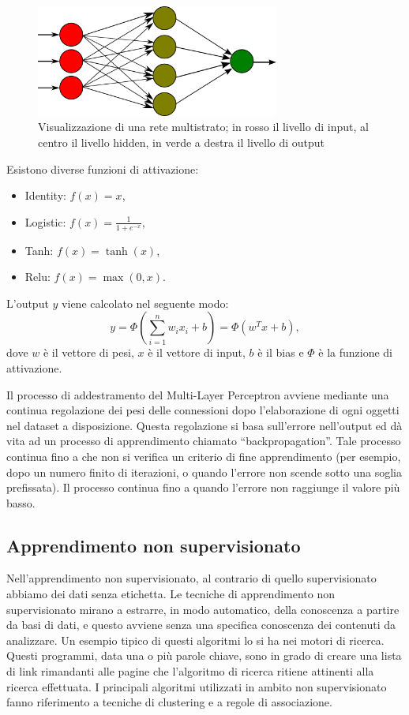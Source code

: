 \documentclass[12pt,italian]{report}
\begin{document}
\begin{figure}[h]
	\centering
	\includegraphics[width = 80mm]{immagini/Multilayer-Perceptron}
	\caption{Visualizzazione di una rete multistrato; in rosso il livello di input, al centro il livello hidden, in verde a destra il livello di output}
\end{figure}
Esistono diverse funzioni di attivazione:
\begin{itemize}
	\item Identity: $f(x) = x$,
	\item Logistic: $f(x) = \frac{1}{1 + e^{-x}}$,
	\item Tanh: $f(x) = \tanh(x)$,
	\item Relu: $f(x) = \max(0, x)$.
\end{itemize}
L'output $y$ viene calcolato nel seguente modo: 
\begin{equation}
y = \Phi \left ( \sum_{i=1}^{n}w_ix_i + b \right ) = \Phi (w^{T}x + b),
\end{equation}
dove $w$ è il vettore di pesi, $x$ è il vettore di input, $b$ è il bias e $\Phi$ è la funzione di attivazione.

Il processo di addestramento del Multi-Layer Perceptron avviene mediante una continua regolazione dei pesi delle connessioni dopo l'elaborazione di ogni oggetti nel dataset a disposizione. Questa regolazione si basa sull'errore nell'output ed dà vita ad un processo di apprendimento chiamato ``backpropagation''. Tale processo continua fino a che non si verifica un criterio di fine apprendimento (per esempio, dopo un numero finito di iterazioni, o quando l'errore non scende sotto una soglia prefissata).
Il processo continua fino a quando l'errore non raggiunge il valore più basso. \cite{multilayerPerceptron}
\subsection{Apprendimento non supervisionato}
Nell’apprendimento non supervisionato, al contrario di quello supervisionato abbiamo dei dati senza etichetta. Le tecniche di apprendimento non supervisionato mirano a estrarre, in modo automatico, della conoscenza a partire da basi di dati, e questo avviene senza una specifica conoscenza dei contenuti da analizzare. Un esempio tipico di questi algoritmi lo si ha nei motori di ricerca. Questi programmi, data una o più parole chiave, sono in grado di creare una lista di link rimandanti alle pagine che l'algoritmo di ricerca ritiene attinenti alla ricerca effettuata. \cite{unsupervisedlearning}
I principali algoritmi utilizzati in ambito non supervisionato fanno riferimento a tecniche di clustering e a regole di associazione.
\end{document}
